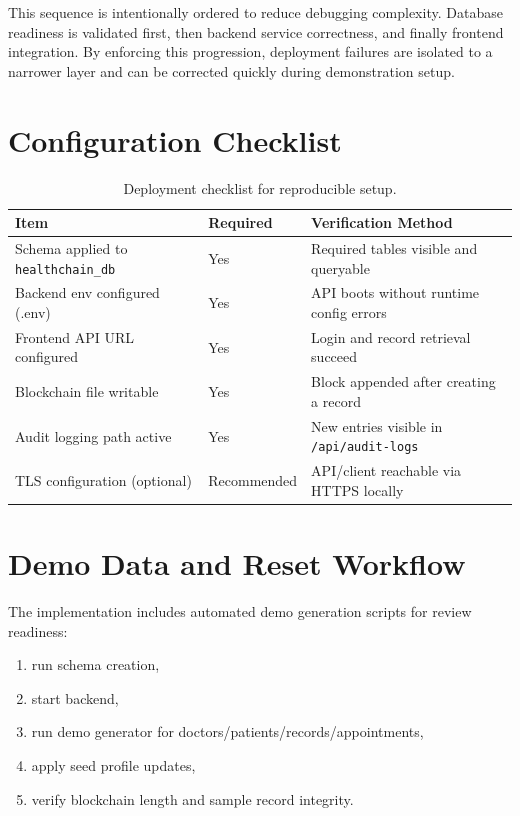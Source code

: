\documentclass[12pt,a4paper]{report}
\begin{document}
This sequence is intentionally ordered to reduce debugging complexity. Database readiness is validated first, then backend service correctness, and finally frontend integration. By enforcing this progression, deployment failures are isolated to a narrower layer and can be corrected quickly during demonstration setup.

\section{Configuration Checklist}

\begin{table}[htbp]
\centering
\caption{Deployment checklist for reproducible setup.}
\label{tab:deployment-checklist}
\begin{tabular}{p{} p{} p{}}
\toprule
\textbf{Item} & \textbf{Required} & \textbf{Verification Method} \\
\midrule
Schema applied to \texttt{healthchain\_db} & Yes & Required tables visible and queryable \\
Backend env configured (.env) & Yes & API boots without runtime config errors \\
Frontend API URL configured & Yes & Login and record retrieval succeed \\
Blockchain file writable & Yes & Block appended after creating a record \\
Audit logging path active & Yes & New entries visible in \texttt{/api/audit-logs} \\
TLS configuration (optional) & Recommended & API/client reachable via HTTPS locally \\
\bottomrule
\end{tabular}
\end{table}

\section{Demo Data and Reset Workflow}

The implementation includes automated demo generation scripts for review readiness:

\begin{enumerate}
\item run schema creation,
\item start backend,
\item run demo generator for doctors/patients/records/appointments,
\item apply seed profile updates,
\item verify blockchain length and sample record integrity.
\end{enumerate}
\end{document}
